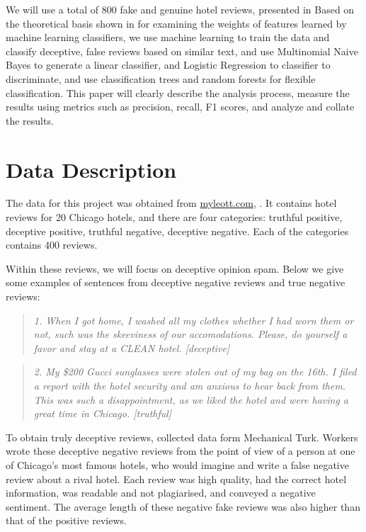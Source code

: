 \documentclass[a4paper, 11pt]{article}
\begin{document}
\begin{multicols}{2}
We will use a total of 800 fake and genuine hotel reviews, presented in \cite{ott2011finding, ott2013negative} Based on the theoretical basis shown in \cite{ott2011finding, ott2013negative} for examining the weights of features learned by machine learning classifiers, we use machine learning to train the data and classify deceptive, false reviews based on similar text, and use Multinomial Naive Bayes to generate a linear classifier, and Logistic Regression to classifier to discriminate, and use classification trees and random forests for flexible classification. This paper will clearly describe the analysis process, measure the results using metrics such as precision, recall, F1 scores, and analyze and collate the results.

\section{Data Description}

The data for this project was obtained from  \href{https://myleott.com/op-spam.html}{myleott.com}, \cite{ott2011finding, ott2013negative}. It contains hotel reviews for 20 Chicago hotels, and there are four categories: truthful positive, deceptive positive, truthful negative, deceptive negative. Each of the categories contains 400 reviews.

Within these reviews, we will focus on deceptive opinion spam. Below we give some examples of sentences from deceptive negative reviews and true negative reviews:
\begin{quote}
{\emph {\footnotesize1. When I got home, I washed all my clothes whether I had worn them or not, such was the skeeviness of our accomodations. Please, do yourself a favor and stay at a CLEAN hotel. [deceptive]}}
\end{quote}
\begin{quote}
{\emph {\footnotesize2. My \$200 Gucci sunglasses were stolen out of my bag on the 16th. I filed a report with the hotel security and am anxious to hear back from them. This was such a disappointment, as we liked the hotel and were having a great time in Chicago. [truthful]}}
\end{quote}

To obtain truly deceptive reviews, \cite{ott2011finding, ott2013negative} collected data form Mechanical Turk. Workers wrote these deceptive negative reviews from the point of view of a person at one of Chicago's most famous hotels, who would imagine and write a false negative review about a rival hotel. Each review was high quality, had the correct hotel information, was readable and not plagiarised, and conveyed a negative sentiment. The average length of these negative fake reviews was also higher than that of the positive reviews.


\end{multicols}
\end{document}
